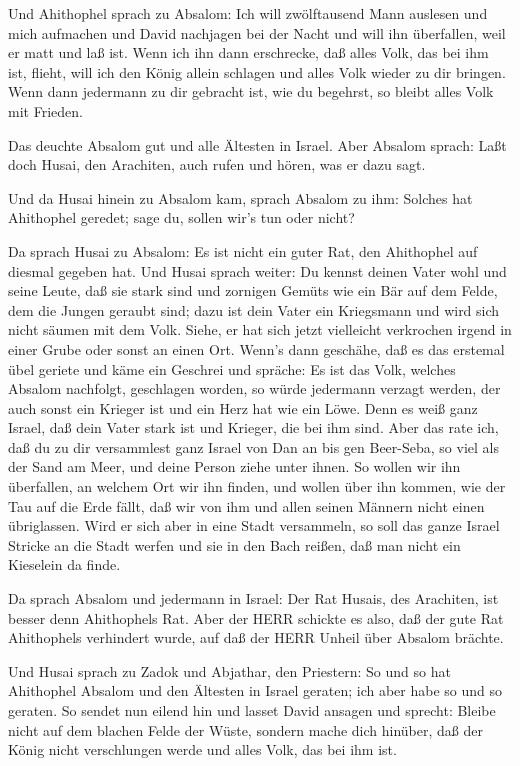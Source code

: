  Und Ahithophel sprach zu Absalom: Ich will zwölftausend
Mann auslesen und mich aufmachen und David nachjagen bei der Nacht
 und will ihn überfallen, weil er matt und laß ist. Wenn ich
ihn dann erschrecke, daß alles Volk, das bei ihm ist, flieht, will ich
den König allein schlagen  und alles Volk wieder zu dir
bringen. Wenn dann jedermann zu dir gebracht ist, wie du begehrst, so
bleibt alles Volk mit Frieden.

 Das deuchte Absalom gut und alle Ältesten in Israel.
 Aber Absalom sprach: Laßt doch Husai, den Arachiten, auch
rufen und hören, was er dazu sagt.

 Und da Husai hinein zu Absalom kam, sprach Absalom zu ihm:
Solches hat Ahithophel geredet; sage du, sollen wir's tun oder nicht?

 Da sprach Husai zu Absalom: Es ist nicht ein guter Rat, den
Ahithophel auf diesmal gegeben hat.  Und Husai sprach
weiter: Du kennst deinen Vater wohl und seine Leute, daß sie stark sind
und zornigen Gemüts wie ein Bär auf dem Felde, dem die Jungen geraubt
sind; dazu ist dein Vater ein Kriegsmann und wird sich nicht säumen mit
dem Volk.  Siehe, er hat sich jetzt vielleicht verkrochen
irgend in einer Grube oder sonst an einen Ort. Wenn's dann geschähe, daß
es das erstemal übel geriete und käme ein Geschrei und spräche: Es ist
das Volk, welches Absalom nachfolgt, geschlagen worden,  so
würde jedermann verzagt werden, der auch sonst ein Krieger ist und ein
Herz hat wie ein Löwe. Denn es weiß ganz Israel, daß dein Vater stark
ist und Krieger, die bei ihm sind.  Aber das rate ich, daß
du zu dir versammlest ganz Israel von Dan an bis gen Beer-Seba, so viel
als der Sand am Meer, und deine Person ziehe unter ihnen. 
So wollen wir ihn überfallen, an welchem Ort wir ihn finden, und wollen
über ihn kommen, wie der Tau auf die Erde fällt, daß wir von ihm und
allen seinen Männern nicht einen übriglassen.  Wird er sich
aber in eine Stadt versammeln, so soll das ganze Israel Stricke an die
Stadt werfen und sie in den Bach reißen, daß man nicht ein Kieselein da
finde.

 Da sprach Absalom und jedermann in Israel: Der Rat Husais,
des Arachiten, ist besser denn Ahithophels Rat. Aber der HERR schickte
es also, daß der gute Rat Ahithophels verhindert wurde, auf daß der HERR
Unheil über Absalom brächte.

 Und Husai sprach zu Zadok und Abjathar, den Priestern: So
und so hat Ahithophel Absalom und den Ältesten in Israel geraten; ich
aber habe so und so geraten.  So sendet nun eilend hin und
lasset David ansagen und sprecht: Bleibe nicht auf dem blachen Felde der
Wüste, sondern mache dich hinüber, daß der König nicht verschlungen
werde und alles Volk, das bei ihm ist.

